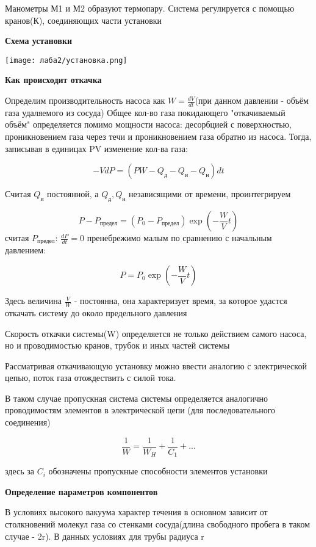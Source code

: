 \documentclass[a4paper]{article}
\begin{document}
Манометры М1 и М2 образуют термопару. Система регулируется с помощью кранов(К), соединяющих части установки

\textbf{Схема установки}

\begin{center}
    \texttt{[image: лаба2/установка.png]}
\end{center}

\pagebreak

\textbf{Как происходит откачка}

Определим производительность насоса как $ W = \frac{dV}{dt}$(при данном давлении - объём газа удаляемого из сосуда)
Общее кол-во газа покидающего "откачиваемый объём" определяется помимо мощности насоса: десорбцией с поверхностью, 
проникновением газа через течи и проникновением газа обратно из насоса. Тогда, записывая в единицах PV изменение кол-ва газа:

\[-VdP = (PW - Q_{\text{д}} - Q_{\text{и}} - Q_{\text{н}})dt\]

Считая $Q_{\text{и}}$ постоянной, а $Q_{\text{д}}, Q_{\text{н}}$ независящими от времени, проинтегрируем

\[P - P_{\text{предел}} = (P_0 - P_{\text{предел}}) \exp(-\frac{W}{V}t)\]
считая $P_{\text{предел}}$: $\frac{dP}{dt} = 0$ пренебрежимо малым по сравнению с начальным давлением:

\[P = P_0 \exp(-\frac{W}{V}t)\]

Здесь величина $\frac{V}{W}$ - постоянна, она характеризует $\textit{время}$, за которое удастся откачать систему до около предельного давления

\vspace{8pt}

Скорость откачки системы(W) определяется не только действием самого насоса, но и проводимостью кранов, трубок и иных частей системы

Рассматривая откачивающую установку можно ввести аналогию с электрической цепью, поток газа отождествить с силой тока.

В таком случае пропускная система системы определяется аналогично проводимостям элементов в электрической цепи (для последовательного соединения)

\[\frac{1}{W} = \frac{1}{W_H} + \frac{1}{C_1} + ...\]

здесь за $C_i$ обозначены пропускные способности элементов установки

\textbf{Определение параметров компонентов}

В условиях высокого вакуума характер течения в основном зависит от столкновений
молекул газа со стенками сосуда(длина свободного пробега в таком случае - 2r). В данных условиях для трубы радиуса r
\end{document}
